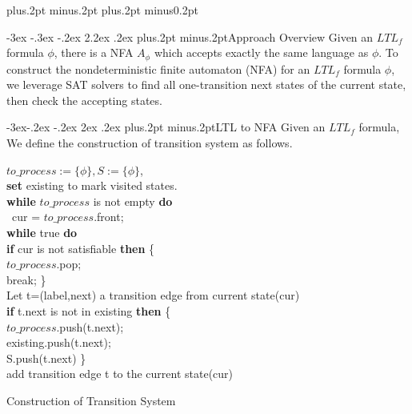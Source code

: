 \documentclass[twoside]{article}
\makeatletter
\def\section{\@startsection{section}{1}{\z@}%
 {-3ex \@plus -.3ex \@minus -.2ex}%
 {2.2ex \@plus.2ex}%
{\normalfont\normalsize\protect\baselineskip=14.5pt plus.2pt minus.2pt\bfseries}}
\def\subsection{\@startsection{subsection}{2}{\z@}%
 {-3ex\@plus -.2ex \@minus -.2ex}%
 {2ex \@plus.2ex}%
{\normalfont\normalsize\protect\baselineskip=12.5pt plus.2pt minus.2pt\bfseries}}
\makeatother
\begin{document}
\baselineskip=18pt plus.2pt minus.2pt
\parskip=0pt plus.2pt minus0.2pt
\begin{multicols}{2}









\section{Approach Overview}
Given an $LTL_f$ formula $\phi$, there is a NFA $A_{\phi}$ which accepts exactly the same language as $\phi$. To construct the nondeterministic finite automaton (NFA) for an $ LTL_f$ formula $\phi$, we leverage SAT solvers to find all one-transition next states of the current state, then check the accepting states. 

\subsection{LTL to NFA}
Given an  $ LTL_f$ formula, We define the construction of transition system as follows. \\
  \begin{algorithm}[H]
    \SetAlgoNoLine
    \BlankLine
 $to\_process:=\{\phi\}, S:=\{\phi\}$, \\
\textbf{set} existing to mark visited states.\\
\textbf{while} $to\_process$ is not empty \textbf{do} \\
\ cur =  $to\_process$.front;  \\
\quad  \textbf{while} true \textbf{do} \\
\qquad   \textbf{if} cur is not satisfiable  \textbf{then} \{ \\
\qquad \quad $to\_process$.pop; \\
\qquad \quad break;     \}\\
 \qquad  Let t=(label,next) a transition edge from current state(cur) \\
\qquad\textbf{if} t.next is not in existing \textbf{then} \{ \\
\qquad \quad $to\_process$.push(t.next); \\
\qquad \quad existing.push(t.next); \\
\qquad  \quad S.push(t.next)  \}\\
\qquad  add transition edge t to the current state(cur)
 \caption{Construction of Transition System}
\end{algorithm}


\end{multicols}
\end{document}
